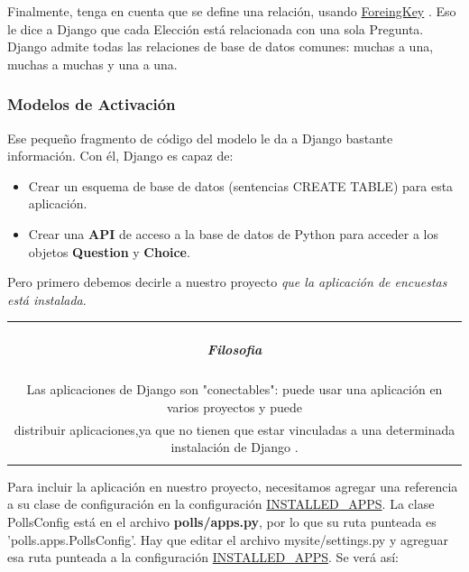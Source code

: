 \documentclass[10pt]{article}
\newcommand{\py}[1]{{\textcolor{B}{Python} #1}}
\newcommand{\django}[1]{{\textcolor{G}{Django} #1}}
\begin{document}
Finalmente, tenga en cuenta que se define una relación, usando {\href{https://docs.djangoproject.com/en/3.0/ref/models/fields/#django.db.models.ForeignKey}{\textcolor{B}{ForeingKey}}}
. Eso le dice a \django{} que cada Elección está relacionada con una sola Pregunta. \django{} admite todas las relaciones de base de datos comunes: muchas a una, muchas a muchas y una a una.


\subsubsection{Modelos de Activación}

Ese pequeño fragmento de código del modelo le da a \django{} bastante información. Con él, \django{} es capaz de:
\begin{itemize}
\item 
Crear un esquema de base de datos (sentencias CREATE TABLE) para esta aplicación.
\item
Crear una \textbf{API} de acceso a la base de datos de \py{} para acceder a los objetos \textbf{Question} y \textbf{Choice}.
\end{itemize}

Pero primero debemos decirle a nuestro proyecto \textit{que la aplicación de encuestas está instalada}.


\begin{table}[H]
	\begin{tabular}{||c||}
	\hline \\
	\begin{Large}
	\textbf{\textit{Filosofia}}
	\end{Large}
	\\\\		
Las aplicaciones de \django{} son "conectables": puede usar una aplicación en varios proyectos y puede\\ distribuir aplicaciones,ya que no tienen que estar vinculadas a una determinada instalación de \django{}.
\\\\ \hline 	
			\end{tabular}
		\end{table}		


Para incluir la aplicación en nuestro proyecto, necesitamos agregar una referencia a su clase de configuración en la configuración {\href{https://docs.djangoproject.com/en/3.0/ref/settings/\#std:setting-INSTALLED\_APPS}{\textcolor{B}{INSTALLED\_APPS}}}. La clase \textcolor{G}{PollsConfig} está en el archivo \textbf{polls/apps.py}, por lo que su ruta punteada es \textcolor{G}{'polls.apps.PollsConfig'}. Hay que editar el archivo mysite/settings.py y agreguar esa ruta punteada a la configuración {\href{https://docs.djangoproject.com/en/3.0/ref/settings/\#std:setting-INSTALLED\_APPS}{\textcolor{B}{INSTALLED\_APPS}}}. Se verá así:
\end{document}

